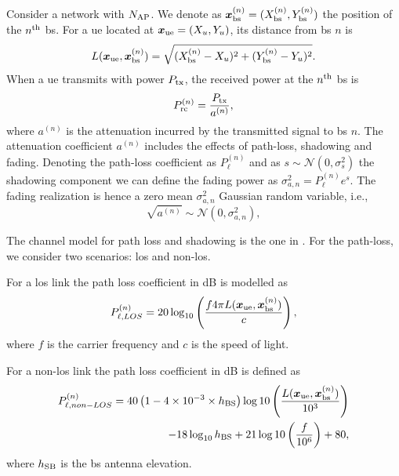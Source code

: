 \documentclass[twocolumns]{IEEEtran}
\begin{document}
Consider a network with $N_{\rm AP}$. We denote as $\bm{x}_{\rm bs}^{(n)} =(X_{\rm bs}^{(n)},Y_{\rm bs}^{(n)})$ the position of the $n^{\rm th}$ \ac{bs}. For a \ac{ue} located at $\bm{x}_{\rm ue}=(X_u,Y_u)$, its distance from \ac{bs} $n$ is
\begin{equation}
    L(\bm{x}_{\rm ue},\bm{x}_{\rm bs}^{(n)}) = \sqrt{(X_{\rm bs}^{(n)}-X_u)^2+(Y_{\rm bs}^{(n)}-Y_u)^2}.
\end{equation}
When a \ac{ue} transmits with power $P_{\rm tx}$, the received power at the $n^{\rm th}$ \ac{bs} is
\begin{equation}\label{eq: rec pow}
    P_{\rm rc}^{(n)}= \frac{P_{\rm tx}}{a^{(n)}},
\end{equation}
where $a^{(n)}$ is the attenuation incurred by the transmitted signal to \ac{bs} $n$. The attenuation coefficient $a^{(n)}$ includes the effects of path-loss, shadowing and fading. Denoting the path-loss coefficient as $P_{\ell}^{(n)}$ and as $s \sim \mathcal{N}(0,\sigma_s^2)$ the shadowing component we can define the fading power as $\sigma_{a,n}^2={P_{\ell}^{(n)}}e^{s}$. The fading realization is hence a zero mean $\sigma_{a,n}^2$ Gaussian random variable, i.e.,
\begin{equation}
    \sqrt{a^{(n)}} \sim \mathcal{N}\left(0,\sigma_{a,n}^2\right),
\end{equation}

The channel model for path loss and shadowing is the one in \cite{3gpp}. For the path-loss, we consider two scenarios: \ac{los} and non-\ac{los}.

For a \ac{los} link the path loss coefficient in dB is modelled as
\begin{equation}\label{eq:los}
    P_{\ell,LOS}^{(n)} = 20\log_{10}\left(\frac{f 4\pi L(\bm{x}_{\rm ue},\bm{x}_{\rm bs}^{(n)})}{c}\right),
\end{equation}
where $f$ is the carrier frequency and $c$ is the speed of light.

For a  non-\ac{los} link the path loss coefficient in dB is defined as
\begin{equation}
\begin{split}
    P_{\ell, non-LOS}^{(n)} = 40\left(1-4\times 10^{-3}\times h_{\rm BS}\right)\log10\left (\frac{L(\bm{x}_{\rm ue},\bm{x}_{\rm bs}^{(n)})}{10^3}\right ) \\
    -18\log_{10}h_{\rm BS}
    + 21\log10\left(\frac{f}{10^6}\right) + 80,
    \end{split}
\end{equation}
where $h_{\rm SB}$ is the \ac{bs} antenna elevation.
\end{document}
